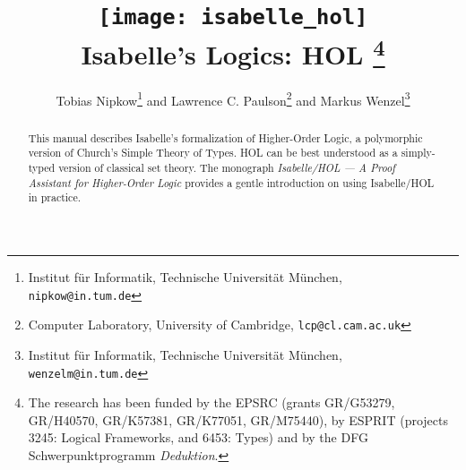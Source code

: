 \documentclass[12pt,a4paper]{report}
\title{\texttt{[image: isabelle\_hol]} \\[4ex]
  Isabelle's Logics: HOL%
  \thanks{The research has been funded by the EPSRC (grants GR/G53279,
    GR\slash H40570, GR/K57381, GR/K77051, GR/M75440), by ESPRIT (projects 3245:
    Logical Frameworks, and 6453: Types) and by the DFG Schwerpunktprogramm
    \emph{Deduktion}.}}
\author{Tobias Nipkow\footnote
{Institut f\"ur Informatik, Technische Universit\"at M\"unchen,
 \texttt{nipkow@in.tum.de}} and
Lawrence C. Paulson\footnote
{Computer Laboratory, University of Cambridge, \texttt{lcp@cl.cam.ac.uk}} and
Markus Wenzel\footnote
{Institut f\"ur Informatik, Technische Universit\"at M\"unchen,
 \texttt{wenzelm@in.tum.de}}}
\begin{document}
\maketitle 

\begin{abstract}
  This manual describes Isabelle's formalization of Higher-Order Logic, a
  polymorphic version of Church's Simple Theory of Types.  HOL can be best
  understood as a simply-typed version of classical set theory.  The monograph
  \emph{Isabelle/HOL --- A Proof Assistant for Higher-Order Logic} provides a
  gentle introduction on using Isabelle/HOL in practice.
\end{abstract}

 \tableofcontents \clearfirst




\printindex
\end{document}
